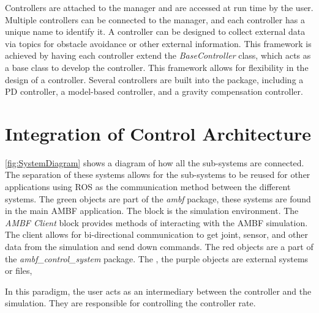 Controllers are attached to the manager and are accessed at run time by the user. Multiple controllers can be connected to the manager, and each controller has a unique name to identify it. A controller can be designed to collect external data via topics for obstacle avoidance or other external information. This framework is achieved by having each controller extend the \textit{BaseController} class, which acts as a base class to develop the controller. This framework allows for flexibility in the design of a controller. Several controllers are built into the package, including a PD controller, a model-based controller, and a gravity compensation controller.  



\section{Integration of Control Architecture}

\autoref{fig:SystemDiagram} shows a diagram of how all the sub-systems are connected. The separation of these systems allows for the sub-systems to be reused for other applications using ROS as the communication method between the different systems. The green objects are part of the \textit{ambf} package, these systems are found in the main AMBF application. The  block is the simulation environment. The \textit{AMBF Client} block provides methods of interacting with the AMBF simulation. The client allows for bi-directional communication to get joint, sensor, and other data from the simulation and send down commands. The red objects are a part of the \textit{ambf\_control\_system} package. The 
, the purple objects are external systems or files, 

 In this paradigm, the user acts as an intermediary between the controller and the simulation. They are responsible for controlling the controller rate.  



